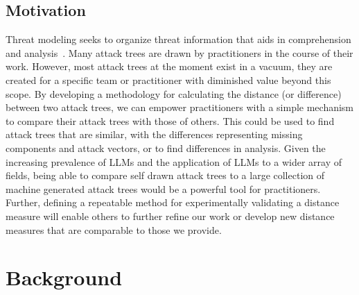 

\subsection{Motivation}


Threat modeling seeks to organize threat information that aids in comprehension and analysis~\cite{andersonSecurityEngineeringGuide2020,schneierSecretsLiesDigital2000}. Many attack trees are drawn by practitioners in the course of their work. However, most attack trees at the moment exist in a vacuum, they are created for a specific team or practitioner with diminished value beyond this scope. By developing a methodology for calculating the distance (or difference) between two attack trees, we can empower practitioners with a simple mechanism to compare their attack trees with those of others. This could be used to find attack trees that are similar, with the differences representing missing components and attack vectors, or to find differences in analysis. Given the increasing prevalence of LLMs and the application of LLMs to a wider array of fields, being able to compare self drawn attack trees to a large collection of machine generated attack trees would be a powerful tool for practitioners. Further, defining a repeatable method for experimentally validating a distance measure will enable others to further refine our work or develop new distance measures that are comparable to those we provide.





\section{Background}
\label{sec:background}






